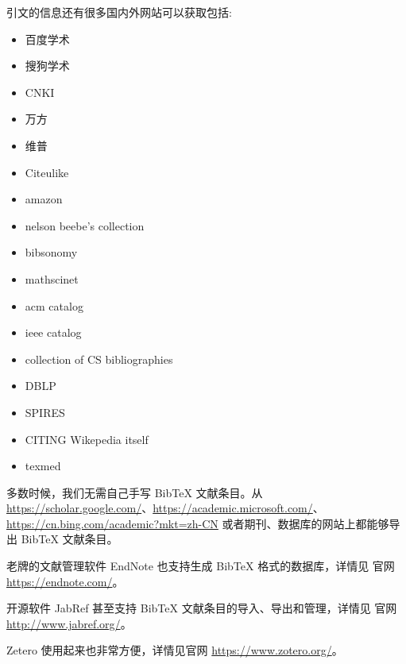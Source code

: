 引文的信息还有很多国内外网站可以获取包括:
\begin{itemize}

  \item 百度学术

  \item 搜狗学术

  \item CNKI

  \item 万方

  \item 维普

  \item Citeulike

  \item amazon

  \item nelson beebe's collection

  \item bibsonomy

  \item mathscinet

  \item acm catalog

  \item ieee catalog

  \item collection of CS bibliographies

  \item DBLP

  \item SPIRES

  \item CITING Wikepedia itself

  \item texmed

\end{itemize}



多数时候，我们无需自己手写 BibTeX 文献条目。从
\url{https://scholar.google.com/}、\url{https://academic.microsoft.com/}、
\url{https://cn.bing.com/academic?mkt=zh-CN}
或者期刊、数据库的网站上都能够导出 BibTeX 文献条目。 

老牌的文献管理软件
EndNote 也支持生成 BibTeX 格式的数据库，详情见
官网\url{https://endnote.com/}。 

开源软件 JabRef 甚至支持 BibTeX
文献条目的导入、导出和管理，详情见 官网\url{http://www.jabref.org/}。

Zetero 使用起来也非常方便，详情见官网 \url{https://www.zotero.org/}。

